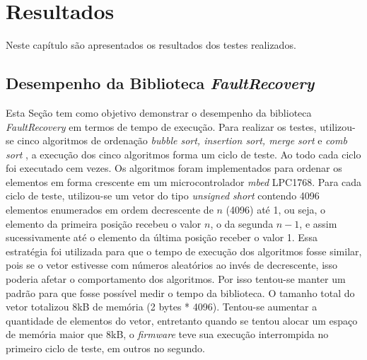 
\chapter{Resultados} \label{cap:Resultados}

Neste capítulo são apresentados os resultados dos testes realizados. 

\section{Desempenho da Biblioteca \textit{FaultRecovery}} \label{Sec:tempoRecovery}

Esta Seção tem como objetivo demonstrar o desempenho da biblioteca \textit{FaultRecovery} em termos de tempo de execução. Para realizar os testes, utilizou-se cinco algoritmos de ordenação \textit{bubble sort, insertion sort, merge sort} e \textit{comb sort} \cite{orderUnicamp, vivaLinux}, a execução dos cinco algoritmos forma um ciclo de teste. Ao todo cada ciclo foi executado cem vezes. Os algoritmos foram implementados para ordenar os elementos em forma crescente em um microcontrolador \textit{mbed} LPC1768. Para cada ciclo de teste, utilizou-se um vetor do tipo \textit{unsigned short} contendo 4096 elementos enumerados em ordem decrescente de $n$ (4096) até 1, ou seja, o elemento da primeira posição recebeu o valor $n$, o da segunda $n-1$, e assim sucessivamente até o elemento da última posição receber o valor 1. Essa estratégia foi utilizada para que o tempo de execução dos algoritmos fosse similar, pois se o vetor estivesse com números aleatórios ao invés de decrescente, isso poderia afetar o comportamento dos algoritmos. Por isso tentou-se manter um padrão para que fosse possível medir o tempo da biblioteca. O tamanho total do vetor totalizou 8kB de memória (2 bytes * 4096). Tentou-se aumentar a quantidade de elementos do vetor, entretanto quando se tentou alocar um espaço de memória maior que 8kB, o \textit{firmware} teve sua execução interrompida no primeiro ciclo de teste, em outros no segundo.

